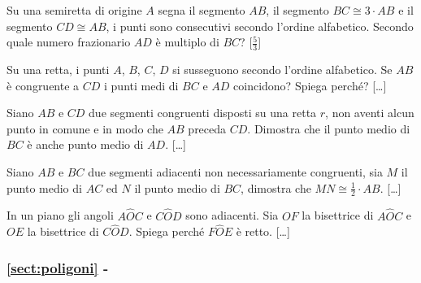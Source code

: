 \begin{multicols}{2}
 
\begin{esercizio}
\label{ese:1.84}
Su una semiretta di origine \(A\) segna il segmento \(AB\), il segmento 
\(BC\cong 3\cdot AB\) e il segmento \(CD\cong AB\), i punti sono 
consecutivi secondo l'ordine alfabetico. Secondo quale numero 
frazionario \(AD\) è multiplo di \(BC\)?
\hfill[\(\frac{5}{3}\)]
\end{esercizio}

\begin{esercizio}
\label{ese:1.87}
Su una retta, i punti \(A\), \(B\), \(C\), \(D\) si susseguono secondo 
l'ordine alfabetico. Se \(AB\) è congruente a \(CD\) i punti medi di \(BC\) 
e \(AD\) coincidono? Spiega perché?
\hfill[\dots]
\end{esercizio}

\begin{esercizio}
\label{ese:1.89}
Siano \(AB\) e \(CD\) due segmenti congruenti disposti su una retta \(r\), 
non aventi alcun punto in comune e in modo che \(AB\) preceda \(CD\). 
Dimostra che il punto medio di \(BC\) è anche punto medio di \(AD\).
\hfill[\dots]
\end{esercizio}

\begin{esercizio}
\label{ese:1.92}
Siano \(AB\) e \(BC\) due segmenti adiacenti non necessariamente 
congruenti, sia \(M\) il punto medio di \(AC\) ed \(N\) il punto medio di 
\(BC\), dimostra che \(MN\cong \frac{1}{2}\cdot AB\).
\hfill[\dots]
\end{esercizio}

\begin{esercizio}
\label{ese:1.95}
In un piano gli angoli \(A\widehat{O}C\) e \(C\widehat{O}D\) sono 
adiacenti. Sia \(OF\) la bisettrice di \(A\widehat{O}C\) e \(OE\) la 
bisettrice di \(C\widehat{O}D\). Spiega perché \(F\widehat{O}E\) è retto.
\hfill[\dots]
\end{esercizio}


\end{multicols}

\begingroup
\hypersetup{linkcolor=black}
\subsubsection*{\ref{sect:poligoni} - }
\endgroup

